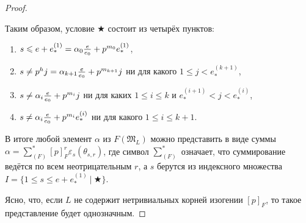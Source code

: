 \documentclass[a4paper]{article}
\newcommand{\ML}{\mathfrak{M}_L}
\newcommand{\Leq}{\leqslant}
\begin{document}
\begin{proof}
\begin{enumerate}
\end{enumerate}

Таким образом, условие $\bigstar$ состоит из четырёх пунктов:
\begin{enumerate}
\item $s\Leq e+e_*^{(1)}=\alpha_0{e\over e_0}+p^{m_0}e_*^{(1)}$,
\item $s\neq p^hj=\alpha_{k+1}{e\over e_0}+p^{m_{k+1}}j$ ни для какого $1\Leq j< e_*^{(k+1)}$,
\item $s\neq\alpha_i{e\over e_0}+p^{m_i}j$ ни для каких $1\Leq i\Leq k$ и $e_*^{(i+1)}<j<e_*^{(i)}$,
\item $s\neq\alpha_i{e\over e_0}+p^{m_i}e_*^{(i)}$ ни для какого $1\Leq i\Leq k+1$.
\end{enumerate}

В итоге любой элемент $\alpha$ из $F(\ML)$ можно представить в виде суммы $\alpha=\sum_{(F)}^*[p]_F^r\varepsilon_s(\theta_{s,r})$, где символ $\sum_{(F)}^*$ означает, что суммирование ведётся по всем неотрицательным $r$, а $s$ берутся из индексного множества $I=\{1\Leq s\Leq e+e_*^{(1)}\ |\ \bigstar\}$.

Ясно, что, если $L$ не содержит нетривиальных корней изогении $[p]_F$, то такое представление будет однозначным.
\end{proof}

\paragraph{}
\end{document}
